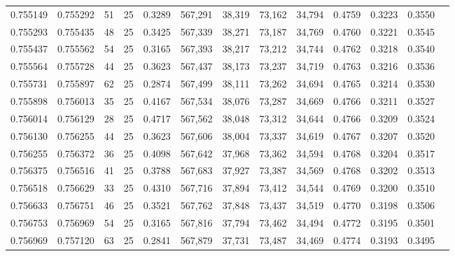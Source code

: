 \begin{tabular}{rrrrrrrrrrrrr}
0.755149 & 0.755292 &    51 &  25 &                                     0.3289 & 567,291 &  38,319 &  73,162 &  34,794 & 0.4759 & 0.3223 & 0.3550 \\
0.755293 & 0.755435 &    48 &  25 &                                     0.3425 & 567,339 &  38,271 &  73,187 &  34,769 & 0.4760 & 0.3221 & 0.3545 \\
0.755437 & 0.755562 &    54 &  25 &                                     0.3165 & 567,393 &  38,217 &  73,212 &  34,744 & 0.4762 & 0.3218 & 0.3540 \\
0.755564 & 0.755728 &    44 &  25 &                                     0.3623 & 567,437 &  38,173 &  73,237 &  34,719 & 0.4763 & 0.3216 & 0.3536 \\
0.755731 & 0.755897 &    62 &  25 &                                     0.2874 & 567,499 &  38,111 &  73,262 &  34,694 & 0.4765 & 0.3214 & 0.3530 \\
0.755898 & 0.756013 &    35 &  25 &                                     0.4167 & 567,534 &  38,076 &  73,287 &  34,669 & 0.4766 & 0.3211 & 0.3527 \\
0.756014 & 0.756129 &    28 &  25 &                                     0.4717 & 567,562 &  38,048 &  73,312 &  34,644 & 0.4766 & 0.3209 & 0.3524 \\
0.756130 & 0.756255 &    44 &  25 &                                     0.3623 & 567,606 &  38,004 &  73,337 &  34,619 & 0.4767 & 0.3207 & 0.3520 \\
0.756255 & 0.756372 &    36 &  25 &                                     0.4098 & 567,642 &  37,968 &  73,362 &  34,594 & 0.4768 & 0.3204 & 0.3517 \\
0.756375 & 0.756516 &    41 &  25 &                                     0.3788 & 567,683 &  37,927 &  73,387 &  34,569 & 0.4768 & 0.3202 & 0.3513 \\
0.756518 & 0.756629 &    33 &  25 &                                     0.4310 & 567,716 &  37,894 &  73,412 &  34,544 & 0.4769 & 0.3200 & 0.3510 \\
0.756633 & 0.756751 &    46 &  25 &                                     0.3521 & 567,762 &  37,848 &  73,437 &  34,519 & 0.4770 & 0.3198 & 0.3506 \\
0.756753 & 0.756969 &    54 &  25 &                                     0.3165 & 567,816 &  37,794 &  73,462 &  34,494 & 0.4772 & 0.3195 & 0.3501 \\
0.756969 & 0.757120 &    63 &  25 &                                     0.2841 & 567,879 &  37,731 &  73,487 &  34,469 & 0.4774 & 0.3193 & 0.3495 \\

\end{tabular}
